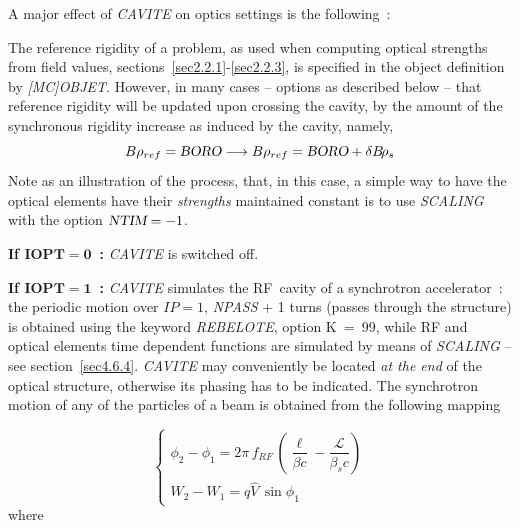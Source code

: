 \bigskip

\noindent A major effect of \textsl{CAVITE} on optics settings is the following~:   

\medskip

\noindent The reference rigidity of a problem, as used when computing optical strengths from field values, 
sections~\ref{sec2.2.1}-\ref{sec2.2.3}, 
 is specified in the object definition by \textsl{[MC]OBJET}.  However, in many 
cases -- options as described below -- that  reference rigidity will be updated upon crossing the cavity, 
by the amount of the synchronous rigidity increase as induced by the cavity, namely, 
$$B\rho_{ref} = \textsl{BORO} \longrightarrow B\rho_{ref} = \textsl{BORO} + \delta B\!\rho_s$$ 
Note as an illustration of the process, that, in this case, a simple way to have the 
optical elements have their \textsl{strengths} maintained constant is to 
use \textsl{SCALING} with the option $\textsl{NTIM}=-1$.

\bigskip

\noindent\textbf{If $\mathbf{IOPT  =  0}$~:}   \textsl{CAVITE} is switched off.  
\bigskip

\noindent\textbf{If $\mathbf{IOPT  =  1}$~:}  \textsl{CAVITE} simulates the RF~cavity of a 
synchrotron accelerator~: 
the periodic motion over $IP  = 1$, \textsl{NPASS} + 1 
turns (passes through the structure) is obtained using the keyword \textsl{REBELOTE}, option 
\mbox{K  =  99},  while  RF  and optical elements  time dependent functions are simulated by means of
\textsl{SCALING} -- see section~\ref{sec4.6.4}. 
 \textsl{CAVITE} may conveniently be located  \textsl{at the end} of the optical 
structure, otherwise its phasing has to be indicated. 
The synchrotron motion of any of the 
\IMAX{} particles of a beam is obtained from  the following mapping 

$$ \left\{ 
\begin{array}{l}
	\phi_ 2-\phi_ 1= 2\pi \, f_{RF}\, 
	     \left(  \dfrac{\ell}{ \beta c} - \dfrac{\mathcal{L} }{ \beta_sc} \right) \\
	W_2-W_1 = q\hat  V\, \sin\phi_ 1  
\end{array}
\right. $$
%
 where
  
